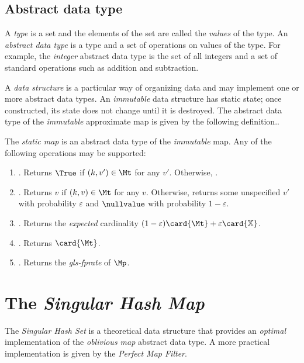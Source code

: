 \documentclass{article}
\begin{document}
\subsection{Abstract data type}
A \emph{type} is a set and the elements of the set are called the \emph{values} of the type. An \emph{abstract data type} is a type and a set of operations on values of the type. For example, the \emph{integer} abstract data type is the set of all integers and a set of standard operations such as addition and subtraction.

A \emph{data structure} is a particular way of organizing data and may implement one or more abstract data types. An \emph{immutable} data structure has static state; once constructed, its state does not change until it is destroyed. The abstract data type of the \emph{immutable} approximate map is given by the following definition..
\begin{definition}
The \emph{static map} is an abstract data type of the \emph{immutable} map. Any of the following operations may be supported:
\begin{enumerate}
    \item {}. Returns $\True$ if $(k,v') \in \Mt$ for any $v'$. Otherwise, \False.
    \item {}. Returns $v$ if $(k,v) \in \Mt$ for any $v$. Otherwise, returns some unspecified $v'$ with probability $\varepsilon$ and $\nullvalue$ with probability $1 - \varepsilon$.
    \item \Cardinality{$\Mp$}. Returns the \emph{expected} cardinality $(1 - \varepsilon) \card{\Mt} + \varepsilon \card{\mathbb{X}}$.
    \item \Count{$\Mt$}. Returns $\card{\Mt}$.
    \item \fprate{$\Mp$}. Returns the \emph{\gls{gls-fprate}} of $\Mp$.
\end{enumerate}
\end{definition}





\section{The \emph{Singular Hash Map}}
The \emph{Singular Hash Set} is a theoretical data structure that provides an \emph{optimal} implementation of the \emph{oblivious map} abstract data type. A more practical implementation is given by the \emph{Perfect Map Filter}\cite{pmf}.
\end{document}
